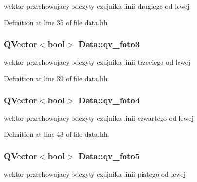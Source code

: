 wektor przechowujacy odczyty czujnika linii drugiego od lewej 



Definition at line 35 of file data.\+hh.

\subsubsection[{\texorpdfstring{qv\+\_\+foto3}{qv_foto3}}]{\setlength{\rightskip}{0pt plus 5cm}Q\+Vector$<$bool$>$ Data\+::qv\+\_\+foto3\hspace{0.3cm}{\ttfamily [private]}}\hypertarget{class_data_a77d5041eb8b005cdd844231341431d26}{}\label{class_data_a77d5041eb8b005cdd844231341431d26}


wektor przechowujacy odczyty czujnika linii trzeciego od lewej 



Definition at line 39 of file data.\+hh.

\subsubsection[{\texorpdfstring{qv\+\_\+foto4}{qv_foto4}}]{\setlength{\rightskip}{0pt plus 5cm}Q\+Vector$<$bool$>$ Data\+::qv\+\_\+foto4\hspace{0.3cm}{\ttfamily [private]}}\hypertarget{class_data_a75ed9bd7841452e381fc969add658c0f}{}\label{class_data_a75ed9bd7841452e381fc969add658c0f}


wektor przechowujacy odczyty czujnika linii czwartego od lewej 



Definition at line 43 of file data.\+hh.

\subsubsection[{\texorpdfstring{qv\+\_\+foto5}{qv_foto5}}]{\setlength{\rightskip}{0pt plus 5cm}Q\+Vector$<$bool$>$ Data\+::qv\+\_\+foto5\hspace{0.3cm}{\ttfamily [private]}}\hypertarget{class_data_a80728b543ea036049dffc151f7a08952}{}\label{class_data_a80728b543ea036049dffc151f7a08952}


wektor przechowujacy odczyty czujnika linii piatego od lewej 



